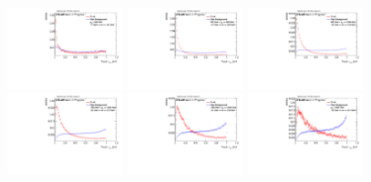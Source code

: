 \begin{figure}[H]
\bigskip
\includegraphics[width=0.3\textwidth]{sascha_input/Appendix/Distributions/top/distributions/beta3/h_normal_tj_nSub32_3_bin1.pdf} \hspace{1mm}
\includegraphics[width=0.3\textwidth]{sascha_input/Appendix/Distributions/top/distributions/beta3/h_normal_tj_nSub32_3_bin2.pdf} \hspace{1mm}
\includegraphics[width=0.3\textwidth]{sascha_input/Appendix/Distributions/top/distributions/beta3/h_normal_tj_nSub32_3_bin3.pdf} 
\bigskip
\includegraphics[width=0.3\textwidth]{sascha_input/Appendix/Distributions/top/distributions/beta3/h_normal_tj_nSub32_3_bin4.pdf} \hspace{1mm}
\includegraphics[width=0.3\textwidth]{sascha_input/Appendix/Distributions/top/distributions/beta3/h_normal_tj_nSub32_3_bin5.pdf} \hspace{1mm}
\includegraphics[width=0.3\textwidth]{sascha_input/Appendix/Distributions/top/distributions/beta3/h_normal_tj_nSub32_3_bin6.pdf} 

\end{figure}
